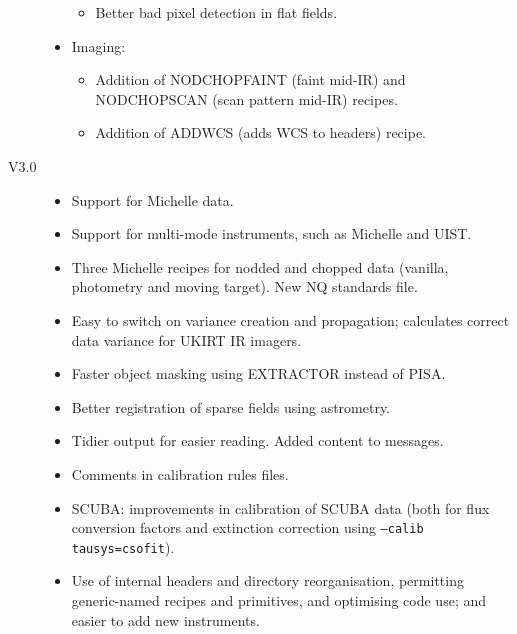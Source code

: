 \documentclass[twoside,11pt]{article}
\renewcommand{\_}{\texttt{\symbol{95}}}
\begin{document}
\begin{description}
\begin{itemize}
\begin{itemize}
\item Better bad pixel detection in flat fields.

\end{itemize}

\item Imaging:

\begin{itemize}

\item Addition of NOD\_CHOP\_FAINT (faint mid-IR) and
    NOD\_CHOP\_SCAN (scan pattern mid-IR) recipes.

\item Addition of ADDWCS (adds WCS to headers) recipe.

\end{itemize}

\end{itemize}

\item[V3.0]

\begin{itemize}

\item Support for Michelle data.

\item Support for multi-mode instruments, such as Michelle and UIST.

\item Three Michelle recipes for nodded and chopped data (vanilla,
  photometry and moving target).  New NQ standards file.

\item Easy to switch on variance creation and propagation; calculates
  correct data variance for UKIRT IR imagers.

\item  Faster object masking using EXTRACTOR instead of PISA.

\item Better registration of sparse fields using astrometry.

\item Tidier output for easier reading.  Added content to messages.

\item Comments in calibration rules files.

\item SCUBA: improvements in calibration of SCUBA data (both for flux
    conversion factors and extinction correction using
     \texttt{--calib tausys=csofit}).

\item Use of internal headers and directory reorganisation, permitting
     generic-named recipes and primitives, and optimising code use;
     and easier to add new instruments.


\end{itemize}
\end{description}
\end{document}
